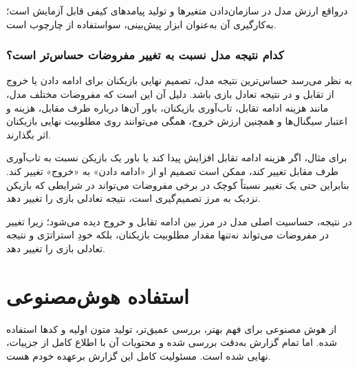\documentclass[12pt]{article}
\begin{document}
درواقع
ارزش مدل در سازمان‌دادن متغیرها و تولید پیامدهای کیفی قابل آزمایش است؛
به‌کارگیری آن به‌عنوان ابزار پیش‌بینی، سواستفاده از چارچوب است.

\subsubsection*{کدام نتیجه مدل نسبت به تغییر مفروضات حساس‌تر است؟}

به نظر می‌رسد حساس‌ترین نتیجه مدل، تصمیم نهایی بازیکنان برای ادامه دادن یا
 خروج از تقابل و در نتیجه تعادل بازی باشد. دلیل آن این است که
 مفروضات مختلف مدل، مانند هزینه ادامه تقابل، تاب‌آوری بازیکنان، 
باور آن‌ها درباره طرف مقابل، هزینه و اعتبار سیگنال‌ها و همچنین
 ارزش خروج، همگی می‌توانند روی مطلوبیت نهایی بازیکنان اثر بگذارند.

برای مثال، اگر هزینه ادامه
 تقابل افزایش پیدا کند یا باور یک بازیکن نسبت به تاب‌آوری طرف مقابل
 تغییر کند، ممکن است تصمیم او از «ادامه دادن» به «خروج» تغییر کند.
 بنابراین حتی یک تغییر نسبتاً کوچک در برخی مفروضات می‌تواند در شرایطی که
 بازیکن نزدیک به مرز تصمیم‌گیری است، نتیجه تعادلی بازی را تغییر دهد.

در نتیجه، حساسیت اصلی مدل در مرز بین ادامه تقابل و خروج
 دیده می‌شود؛ زیرا تغییر در مفروضات می‌تواند نه‌تنها مقدار 
مطلوبیت بازیکنان، بلکه خودِ استراتژی و نتیجه تعادلی بازی را تغییر دهد.


\section*{استفاده هوش‌مصنوعی}
از هوش مصنوعی برای فهم بهتر، بررسی عمیق‌تر، تولید متون اولیه و کدها استفاده شده.
اما تمام گزارش به‌دقت بررسی شده و محتویات آن با اطلاع کامل
از جزییات، نهایی شده است.
 مسئولیت کامل این گزارش برعهده خودم هست.
\end{document}
